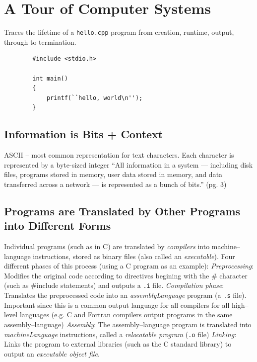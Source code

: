 \documentclass[../bryant_comp_sys.tex]{subfiles}
\begin{document}
\section{A Tour of Computer Systems}

    \begin{outline}
        \1 Traces the lifetime of a \texttt{hello.cpp} program from creation, runtime, output, through to termination.
    \end{outline}

    \lstset{language=C++}
    \begin{lstlisting}
        #include <stdio.h>

        int main()
        {
            printf(``hello, world\n'');
        }
    \end{lstlisting}

    \subsection{Information is Bits + Context}
        \begin{outline}
            \1 ASCII -- most common representation for text characters. Each character is represented by a byte-sized integer
            \1 ``All information in a system --- including disk files, programs stored in memory, user data stored in memory, and data transferred across a network --- is represented as a bunch of bits.'' (pg. 3)
        \end{outline}

    \subsection{Programs are Translated by Other Programs into Different Forms}
        \begin{outline}
            \1 Individual programs (such as in C) are translated by \textit{\glspl{compiler}} into machine--language instructions, stored as binary files (also called an \textit{executable}).
            \1 Four different phases of this process (using a C program as an example):
                \2 \textit{Preprocessing}: Modifies the original code according to directives begining with the \# character (such as \#include statements) and outputs a \texttt{.i} file.
                \2 \textit{Compilation phase}: Translates the preprocessed code into an \textit{\gls{assemblyLanguage}} program (a \texttt{.s} file). Important since this is a common output language for all compilers for all high--level languages (e.g. C and Fortran compilers output programs in the same assembly--language)
                \2 \textit{Assembly}: The assembly--language program is translated into \textit{\gls{machineLanguage}} instructions, called a \textit{relocatable program} (\texttt{.o} file)
                \2 \textit{Linking}: Links the program to external libraries (such as the C standard library) to output an \textit{executable object file}.
        \end{outline}
\end{document}
